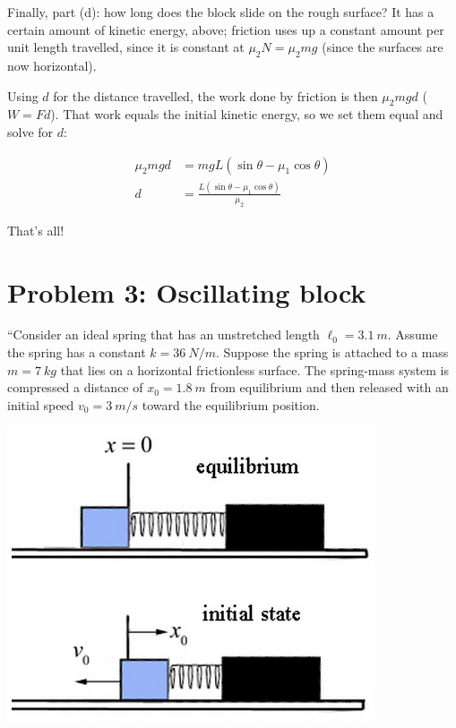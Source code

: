 \documentclass[12pt,a4paper]{report}
\begin{document}
Finally, part (d): how long does the block slide on the rough surface? It has a certain amount of kinetic energy, above; friction uses up a constant amount per unit length travelled, since it is constant at $\mu_2 N = \mu_2 m g$ (since the surfaces are now horizontal).

Using $d$ for the distance travelled, the work done by friction is then $\mu_2 m g d$ ($W = F d$). That work equals the initial kinetic energy, so we set them equal and solve for $d$:

\begin{align}
\mu_2 m g d &= m g L (\sin \theta - \mu_1 \cos \theta)\\
d           &= \frac{L (\sin \theta - \mu_1 \cos \theta)}{\mu_2}
\end{align}

That's all!

\section{Problem 3: Oscillating block}

``Consider an ideal spring that has an unstretched length $\ell_0 = \SI{3.1}{m}$. Assume the spring has a constant $k = \SI{36}{N/m}$. Suppose the spring is attached to a mass $m = \SI{7}{kg}$ that lies on a horizontal frictionless surface. The spring-mass system is compressed a distance of $x_0 = \SI{1.8}{m}$ from equilibrium and then released with an initial speed $v_0 = \SI{3}{m/s}$ toward the equilibrium position.

\begin{center}
\includegraphics[scale=0.7]{Graphics/h4p3}
\end{center}
\end{document}
